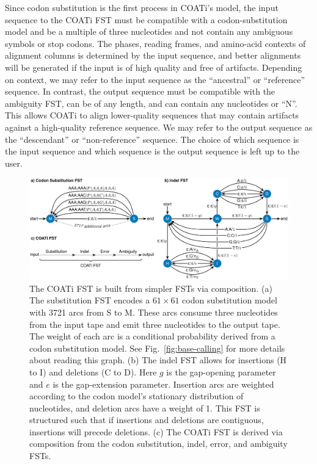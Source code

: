 \documentclass[12pt,letterpaper]{article}
\begin{document}
Since codon substitution is the first process in COATi's model, the input sequence to the COATi FST must be compatible with a codon-substitution model and be a multiple of three nucleotides and not contain any ambiguous symbols or stop codons. The phases, reading frames, and amino-acid contexts of alignment columns is determined by the input sequence, and better alignments will be generated if the input is of high quality and free of artifacts. Depending on context, we may refer to the input sequence as the ``ancestral'' or ``reference'' sequence. In contrast, the output sequence must be compatible with the ambiguity FST, can be of any length, and can contain any nucleotides or ``N''. This allows COATi to align lower-quality sequences that may contain artifacts against a high-quality reference sequence. We may refer to the output sequence as the ``descendant'' or ``non-reference'' sequence. The choice of which sequence is the input sequence and which sequence is the output sequence is left up to the user.

\begin{figure}[h!]
\includegraphics[width=\textwidth]{figures/fig-fst-coati.pdf}
\caption{The COATi FST is built from simpler FSTs via composition.
(a) The substitution FST encodes a $61 \times 61 $ codon substitution model with 3721 arcs from S to M. These arcs consume three nucleotides from the input tape and emit three nucleotides to the output tape. The weight of each arc is a conditional probability derived from a codon substitution model. See Fig.~\ref{fig:base-calling} for more details about reading this graph.
%
(b) The indel FST allows for insertions (H to I) and deletions (C to D). Here $g$ is the gap-opening parameter and $e$ is the gap-extension parameter.
Insertion arcs are weighted according to the codon model's stationary distribution of nucleotides, and deletion arcs have a weight of 1. This FST is structured such that if insertions and deletions are contiguous, insertions will precede deletions.
%
(c) The COATi FST is derived via composition from the codon substitution, indel, error, and ambiguity FSTs.
}
\label{fig:coati-fst}
\end{figure}
\end{document}
